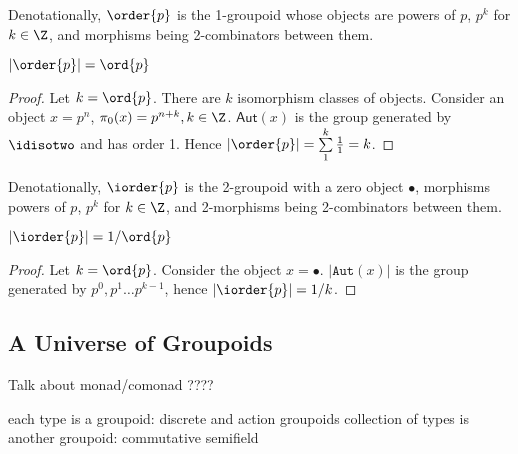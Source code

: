 \begin{definition}[$\order{p}$]
  Denotationally, $\order{p}$ is the 1-groupoid whose objects are powers
  of $p$, $p^k$ for $k \in \Z$, and morphisms being 2-combinators
  between them.
\end{definition}

\begin{lemma}
  $|\order{p}| = \ord{p}$
\end{lemma}

\begin{proof}
  Let $k = \ord{p}$. There are $k$ isomorphism classes of
  objects. Consider an object $x = p^n$,
  $\pi_0(x) = p^{n + k}, k \in \Z$. $\textsf{Aut}(x)$ is the group
  generated by $\idisotwo$ and has order 1. Hence
  $|\order{p}| = \sum\limits_{1}^{k}\frac{1}{1} = k$.
\end{proof}

\begin{definition}[$\iorder{p}$]
  Denotationally, $\iorder{p}$ is the 2-groupoid with a zero object
  $\bullet$, morphisms powers of $p$, $p^k$ for $k \in \Z$, and
  2-morphisms being 2-combinators between them.
\end{definition}

\begin{lemma}
  $|\iorder{p}| = 1/\ord{p}$
\end{lemma}

\begin{proof}
  Let $k = \ord{p}$. Consider the object $x =
  \bullet$. $|\texttt{Aut}(x)|$ is the group generated by
  $p^0, p^1 \dots p^{k-1}$, hence $|\iorder{p}| = 1/k$.
\end{proof}


\subsection{A Universe of Groupoids}

Talk about monad/comonad ????

each type is a groupoid: discrete and action groupoids
collection of types is another groupoid: commutative semifield




